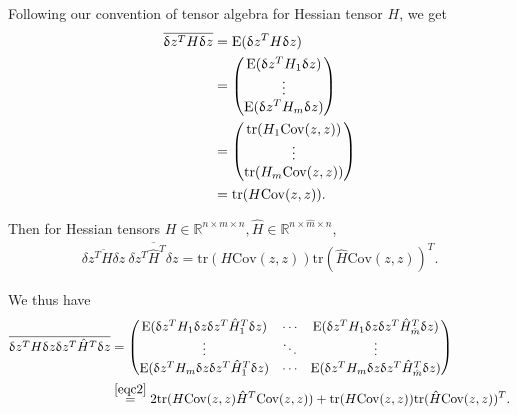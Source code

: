 \documentclass[article,ij4uq]{ij4uq}              %
\begin{document}
\par Following our convention of tensor algebra for Hessian tensor $H$, we get
\begin{align}
    \overline{\delta z^{T}H\delta z}&=\mathrm{E}(\delta z^{T}H\delta z)\notag\\
    &=\begin{pmatrix}\mathrm{E}(\delta z^{T}H_{1}\delta z)\\\vdots\\\mathrm{E}(\delta z^{T}H_{m}\delta z)\end{pmatrix}\notag\\
    &=\begin{pmatrix}\mathrm{tr}(H_{1}\mathrm{Cov}(z,z))\\\vdots\\\mathrm{tr}(H_{m}\mathrm{Cov}(z,z))\end{pmatrix}\notag\\
    &=\mathrm{tr}(H\mathrm{Cov}(z,z)).\label{eqc9}
\end{align}
\par Then for Hessian tensors $H\in\mathbb{R}^{n\times m\times n},\hat{H}\in\mathbb{R}^{n\times \hat{m}\times n}$,
\begin{align}
    \overline{\delta z^{T}H\delta z}\ \overline{\delta z^{T}\hat{H}^{T}\delta z}=\mathrm{tr}(H\mathrm{Cov}(z,z))\mathrm{tr}(\hat{H}\mathrm{Cov}(z,z))^{T}.\label{eqc10}
\end{align}
\par We thus have
\begin{align}
    \overline{\delta z^{T}H\delta z \delta z^{T}\hat{H}^{T}\delta z}&=\begin{pmatrix}\mathrm{E}(\delta z^{T}H_{1}\delta z \delta z^{T}\hat{H}_{1}^{T}\delta z) & \cdots & \mathrm{E}(\delta z^{T}H_{1}\delta z \delta z^{T}\hat{H}_{\hat{m}}^{T}\delta z)\\\vdots & \ddots & \vdots\\\mathrm{E}(\delta z^{T}H_{m}\delta z \delta z^{T}\hat{H}_{1}^{T}\delta z) & \cdots & \mathrm{E}(\delta z^{T}H_{m}\delta z \delta z^{T}\hat{H}_{\hat{m}}^{T}\delta z) \end{pmatrix}\notag\\
    & \stackrel{\mbox{\eqref{eqc2}}}{=}2\mathrm{tr}(H\mathrm{Cov}(z,z)\hat{H}^{T}\mathrm{Cov}(z,z))+\mathrm{tr}(H\mathrm{Cov}(z,z))\mathrm{tr}(\hat{H}\mathrm{Cov}(z,z))^{T}.\label{eqc11}
\end{align}




\end{document}
